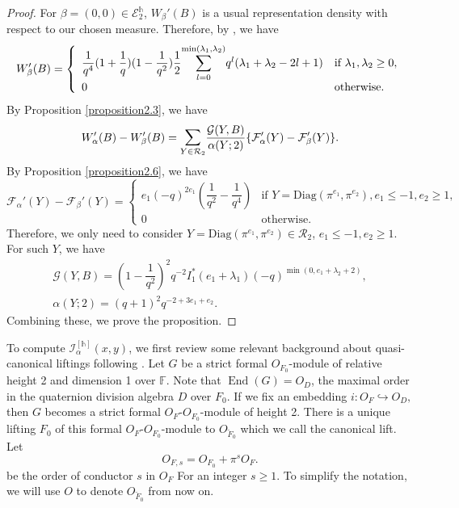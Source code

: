 \documentclass[11pt,oneside]{amsart}
\theoremstyle{plain}
\theoremstyle{definition}
\theoremstyle{remark}
\newcommand{\tx}[1]{\text{#1}}
\newcommand{\CE}{{\mathcal E}}
\newcommand{\CF}{{\mathcal F}}
\newcommand{\CG}{{\mathcal G}}
\newcommand{\CI}{{\mathcal I}}
\newcommand{\CR}{{\mathcal R}}
\newcommand{\diag}{\mathrm{Diag}}
\numberwithin{equation}{section}
\begin{document}
	\begin{proof}
		For $\beta=(0,0) \in \CE_{2}^{\mathds{h}}$, $W_{\beta}'(B)$ is a usual representation density with respect to our chosen measure. Therefore, by \cite[Corollary 9.5]{KR1}, we have
		\begin{equation*}
			W_{\beta}'(B)=\left\lbrace \begin{array}{ll}\dfrac{1}{q^4}(1+\dfrac{1}{q})(1-\dfrac{1}{q^2})\dfrac{1}{2}\mathlarger{\sum}_{l=0}^{\min(\lambda_1,\lambda_2)}q^{l}(\lambda_1+\lambda_2-2l+1) & \tx{if }\lambda_1,\lambda_2 \geq 0,\\
				0 & \tx{otherwise}.
			\end{array}\right.
		\end{equation*}
		By Proposition \ref{proposition2.3}, we have
		\begin{equation*}
			W_{\alpha}'(B)-W_{\beta}'(B)=\mathlarger{\sum}_{Y \in \CR_2}\dfrac{\CG(Y,B)}{\alpha(Y;2)}\lbrace \CF_{\alpha}'(Y)-\CF_{\beta}'(Y)\rbrace.
		\end{equation*}
		By Proposition \ref{proposition2.6}, we have
		\begin{equation*}
			\CF_{\alpha}'(Y)-\CF_{\beta}'(Y)=\left\lbrace \begin{array}{ll}
				e_1 (-q)^{2e_1}(\dfrac{1}{q^2}-\dfrac{1}{q^4}) & \tx{if }Y=\diag(\pi^{e_1},\pi^{e_2}), e_1 \leq -1, e_2 \geq 1,\\
				0 & \tx{otherwise}.
			\end{array}\right.
		\end{equation*}
		Therefore, we only need to consider $Y=\diag(\pi^{e_1},\pi^{e_2}) \in \CR_2$, $e_1 \leq -1, e_2 \geq 1$. For such $Y$, we have
		\begin{equation*}
			\begin{array}{l}
				\CG(Y,B)=(1-\dfrac{1}{q^2})^2q^{-2}I_1^*(e_1+\lambda_1)(-q)^{\min(0,e_1+\lambda_2+2)},\\
				\alpha(Y;2)=(q+1)^2q^{-2+3e_1+e_2}.
			\end{array}
		\end{equation*}
		Combining these, we prove the proposition.
	\end{proof}
	
 
	
	
	
	
	To compute $\CI_{\alpha}^{[\mathds{h}]}(x,y)$, we first review some relevant background about quasi-canonical liftings following \cite{KR1}.
	Let $G$ be a strict formal $O_{F_0}$-module   of relative height 2 and dimension 1 over $\mathbb{F}$.   Note that $\operatorname{End}(G)=O_D$, the maximal order in the quaternion division algebra $D$ over $F_0$. If we fix an embedding $i: O_F \hookrightarrow O_D,$ then  $G$ becomes a strict formal $O_F$-$O_{F_0}$-module of height 2. There is a unique lifting $F_0$ of this formal $O_F$-$O_{F_0}$-module to $O_{\breve{F}_0}$ which we call the canonical lift. Let
	$$
	O_{F, s}=O_{F_0}+\pi^s O_F .
	$$
	be the order of conductor $s$ in $O_F$  For an integer $s \geq 1$. To simplify the notation, we will use $O$ to denote $O_{\breve{F}_0}$ from now on.
	
\end{document}
